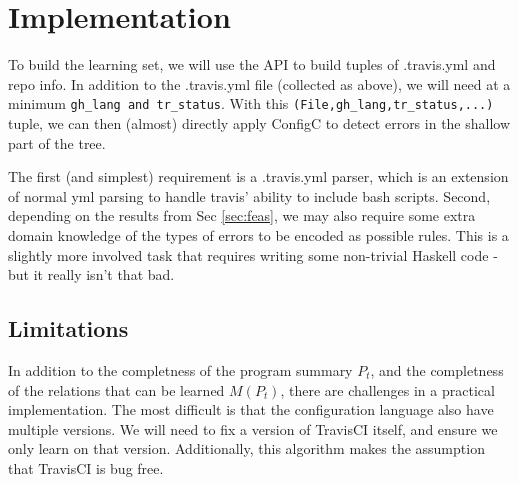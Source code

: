 \section{Implementation}

To build the learning set, we will use the API to build tuples of .travis.yml and repo info.
In addition to the .travis.yml file (collected as above), we will need at a minimum \verb|gh_lang and tr_status|.
With this \verb|(File,gh_lang,tr_status,...)| tuple, we can then (almost) directly apply ConfigC to detect errors in the shallow part of the tree.

The first (and simplest) requirement is a .travis.yml parser, which is an extension of normal yml parsing to handle travis' ability to include bash scripts.
Second, depending on the results from Sec \ref{sec:feas}, we may also require some extra domain knowledge of the types of errors to be encoded as possible rules.
This is a slightly more involved task that requires writing some non-trivial Haskell code - but it really isn't that bad.

\subsection{Limitations}
In addition to the completness of the program summary $P_t$, and the completness of the relations that can be learned $M(P_t)$, there are challenges in a practical implementation.
The most difficult is that the configuration language also have multiple versions. 
We will need to fix a version of TravisCI itself, and ensure we only learn on that version.
Additionally, this algorithm makes the assumption that TravisCI is bug free. 

